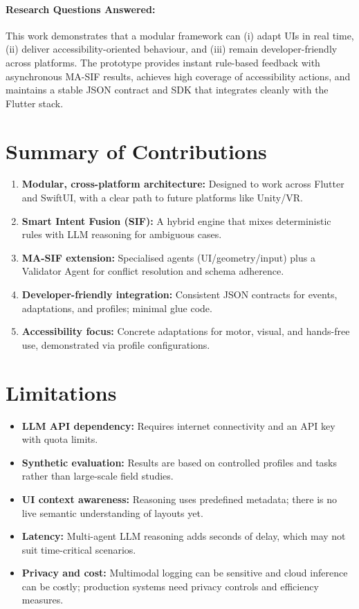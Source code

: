 \documentclass[openany]{book}
\begin{document}
\paragraph{Research Questions Answered:}
This work demonstrates that a modular framework can (i) adapt UIs in real time, (ii) deliver accessibility-oriented behaviour, and (iii) remain developer-friendly across platforms. The prototype provides instant rule-based feedback with asynchronous MA-SIF results, achieves high coverage of accessibility actions, and maintains a stable JSON contract and SDK that integrates cleanly with the Flutter stack.

\section{Summary of Contributions}
\begin{enumerate}
    \item \textbf{Modular, cross-platform architecture:} Designed to work across Flutter and SwiftUI, with a clear path to future platforms like Unity/VR.
    \item \textbf{Smart Intent Fusion (SIF):} A hybrid engine that mixes deterministic rules with LLM reasoning for ambiguous cases.
    \item \textbf{MA-SIF extension:} Specialised agents (UI/geometry/input) plus a Validator Agent for conflict resolution and schema adherence.
    \item \textbf{Developer-friendly integration:} Consistent JSON contracts for events, adaptations, and profiles; minimal glue code.
    \item \textbf{Accessibility focus:} Concrete adaptations for motor, visual, and hands-free use, demonstrated via profile configurations.
\end{enumerate}

\section{Limitations}
\begin{itemize}
    \item \textbf{LLM API dependency:} Requires internet connectivity and an API key with quota limits.
    \item \textbf{Synthetic evaluation:} Results are based on controlled profiles and tasks rather than large-scale field studies.
    \item \textbf{UI context awareness:} Reasoning uses predefined metadata; there is no live semantic understanding of layouts yet.
    \item \textbf{Latency:} Multi-agent LLM reasoning adds seconds of delay, which may not suit time-critical scenarios.
    \item \textbf{Privacy and cost:} Multimodal logging can be sensitive and cloud inference can be costly; production systems need privacy controls and efficiency measures.
\end{itemize}
\end{document}

